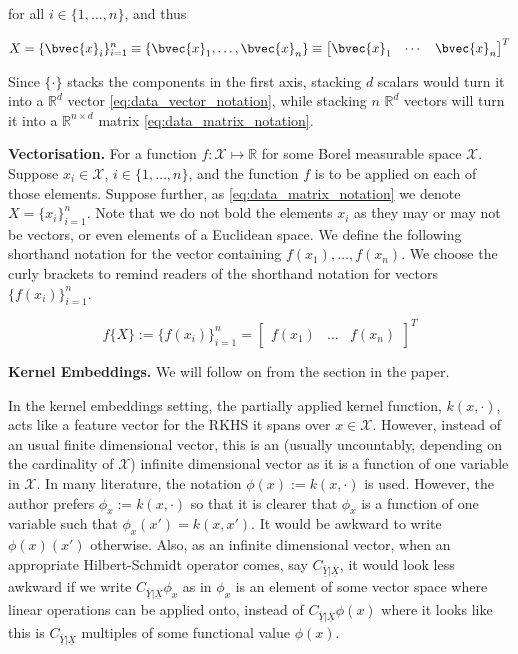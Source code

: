 \documentclass[twoside]{article} \usepackage{aistats2017}
\newcommand{\rv}[1]{\underline{\overline{#1}}}
\newcommand{\warn}[1]{{\color{red} #1}}
\begin{document}
	for all $i \in \{1, \dots, n\}$, and thus

	\begin{equation}
		X = \{\bvec{x}_{i}\}_{i = 1}^{n} \equiv \{\bvec{x}_{1}, \dots, \bvec{x}_{n}\} \equiv \begin{bmatrix}
			\bvec{x}_{1} & \cdots & \bvec{x}_{n}
		\end{bmatrix}^{T}
	\label{eq:data_matrix_notation}
	\end{equation}
		
	Since $\{ \cdot \}$ stacks the components in the first axis, stacking $d$ scalars would turn it into a $\mathbb{R}^{d}$ vector \eqref{eq:data_vector_notation}, while stacking $n$ $\mathbb{R}^{d}$ vectors will turn it into a $\mathbb{R}^{n \times d}$ matrix \eqref{eq:data_matrix_notation}.
	
	\textbf{Vectorisation.} For a function $f : \mathcal{X} \mapsto \mathbb{R}$ for some Borel measurable space $\mathcal{X}$. Suppose $x_{i} \in \mathcal{X}$, $i \in \{1, \dots, n\}$, and the function $f$ is to be applied on each of those elements. Suppose further, as \eqref{eq:data_matrix_notation} we denote $X = \{x_{i}\}_{i = 1}^{n}$. Note that we do not bold the elements $x_{i}$ as they may or may not be vectors, or even elements of a Euclidean space. We define the following shorthand notation for the vector containing $f(x_{1}), \dots, f(x_{n})$. We choose the curly brackets to remind readers of the shorthand notation for vectors $\{f(x_{i})\}_{i = 1}^{n}$.
	
	\begin{equation}
		f\{X\} := \{f(x_{i})\}_{i = 1}^{n} = {\begin{bmatrix} f(x_{1}) & \dots & f(x_{n}) \end{bmatrix}}^{T}
	\end{equation}
	
	\textbf{Kernel Embeddings.} \warn{We will follow on from the section in the paper.}
	
	In the kernel embeddings setting, the partially applied kernel function, $k(x, \cdot)$, acts like a feature vector for the RKHS it spans over $x \in \mathcal{X}$. However, instead of an usual finite dimensional vector, this is an (usually uncountably, depending on the cardinality of $\mathcal{X}$) infinite dimensional vector as it is a function of one variable in $\mathcal{X}$. In many literature, the notation $\phi(x) := k(x, \cdot)$ is used. However, the author prefers $\phi_{x} := k(x, \cdot)$ so that it is clearer that $\phi_{x}$ is a function of one variable such that $\phi_{x}(x') = k(x, x')$. It would be awkward to write $\phi(x)(x')$ otherwise. Also, as an infinite dimensional vector, when an appropriate Hilbert-Schmidt operator comes, say $C_{\rv{Y} | \rv{X}}$, it would look less awkward if we write $C_{\rv{Y} | \rv{X}} \phi_{x}$ as in $\phi_{x}$ is an element of some vector space where linear operations can be applied onto, instead of $C_{\rv{Y} | \rv{X}} \phi(x)$ where it looks like this is $C_{\rv{Y} | \rv{X}}$ multiples of some functional value $\phi(x)$.
	
\end{document}
